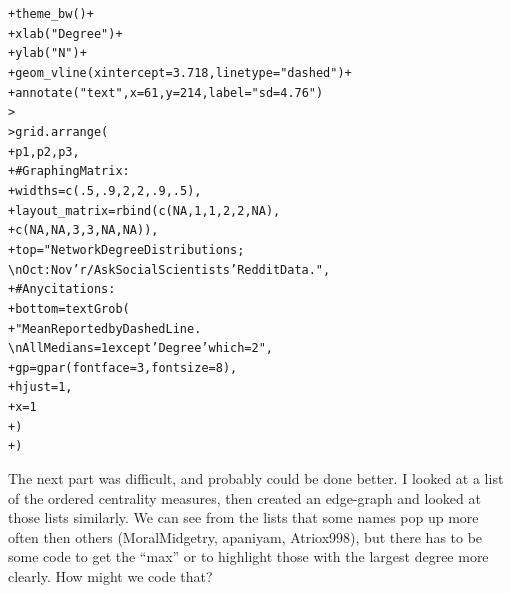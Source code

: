 \documentclass[12pt]{article}\usepackage[]{graphicx}\usepackage[]{color}
\makeatletter
\newcommand{\hlnum}[1]{\textcolor[rgb]{0.82,0.78,0.62}{#1}}%
\newcommand{\hlstr}[1]{\textcolor[rgb]{0.82,0.78,0.62}{#1}}%
\newcommand{\hlcom}[1]{\textcolor[rgb]{0.404,0.408,0.42}{#1}}%
\newcommand{\hlopt}[1]{\textcolor[rgb]{0.882,0.878,0.898}{#1}}%
\newcommand{\hlstd}[1]{\textcolor[rgb]{0.882,0.878,0.898}{#1}}%
\newcommand{\hlkwc}[1]{\textcolor[rgb]{0.812,0.522,0.388}{#1}}%
\newcommand{\hlkwd}[1]{\textcolor[rgb]{0.733,0.388,0.812}{#1}}%
\newenvironment{kframe}{%
 \def\at@end@of@kframe{}%
 \ifinner\ifhmode%
  \def\at@end@of@kframe{\end{minipage}}%
  \begin{minipage}{\columnwidth}%
 \fi\fi%
 \def\FrameCommand##1{\hskip\@totalleftmargin \hskip-\fboxsep
 \colorbox{shadecolor}{##1}\hskip-\fboxsep
     \hskip-\linewidth \hskip-\@totalleftmargin \hskip\columnwidth}%
 \MakeFramed {\advance\hsize-\width
   \@totalleftmargin\z@ \linewidth\hsize
   \@setminipage}}%
 {\par\unskip\endMakeFramed%
 \at@end@of@kframe}
\newenvironment{knitrout}{}{} %
\makeatother
\begin{document}
\begin{flushleft}
\begin{center}
\begin{knitrout}
\begin{kframe}
\begin{alltt}
\hlstd{+ }     \hlkwd{theme_bw}\hlstd{()}\hlopt{+}
\hlstd{+ }     \hlkwd{xlab}\hlstd{(}\hlstr{"Degree"}\hlstd{)}\hlopt{+}
\hlstd{+ }     \hlkwd{ylab}\hlstd{(}\hlstr{"N"}\hlstd{)}\hlopt{+}
\hlstd{+ }     \hlkwd{geom_vline}\hlstd{(}\hlkwc{xintercept}\hlstd{=}\hlnum{3.718}\hlstd{,} \hlkwc{linetype}\hlstd{=}\hlstr{"dashed"}\hlstd{)}\hlopt{+}
\hlstd{+ }     \hlkwd{annotate}\hlstd{(}\hlstr{"text"}\hlstd{,} \hlkwc{x} \hlstd{=} \hlnum{61}\hlstd{,} \hlkwc{y} \hlstd{=} \hlnum{214}\hlstd{,} \hlkwc{label} \hlstd{=} \hlstr{"sd = 4.76"}\hlstd{)}
\hlstd{> }
\hlstd{> }\hlkwd{grid.arrange}\hlstd{(}
\hlstd{+ }     \hlstd{p1, p2, p3,}
\hlstd{+ }     \hlcom{# Graphing Matrix:}
\hlstd{+ }     \hlkwc{widths} \hlstd{=} \hlkwd{c}\hlstd{(}\hlnum{.5}\hlstd{,} \hlnum{.9} \hlstd{,}\hlnum{2}\hlstd{,} \hlnum{2}\hlstd{,} \hlnum{.9}\hlstd{,} \hlnum{.5}\hlstd{),}
\hlstd{+ }     \hlkwc{layout_matrix} \hlstd{=} \hlkwd{rbind}\hlstd{(}\hlkwd{c}\hlstd{(}\hlnum{NA}\hlstd{,} \hlnum{1}\hlstd{,} \hlnum{1}\hlstd{,} \hlnum{2}\hlstd{,} \hlnum{2}\hlstd{,} \hlnum{NA}\hlstd{),}
\hlstd{+ }                           \hlkwd{c}\hlstd{(}\hlnum{NA}\hlstd{,} \hlnum{NA}\hlstd{,} \hlnum{3}\hlstd{,} \hlnum{3}\hlstd{,} \hlnum{NA}\hlstd{,} \hlnum{NA}\hlstd{)),}
\hlstd{+ }     \hlkwc{top} \hlstd{=} \hlstr{"Network Degree Distributions;
          \textbackslash{}n Oct : Nov'r/AskSocialScientists' Reddit Data."}\hlstd{,}
\hlstd{+ }     \hlcom{# Any citations:}
\hlstd{+ }     \hlkwc{bottom} \hlstd{=} \hlkwd{textGrob}\hlstd{(}
\hlstd{+ }          \hlstr{"Mean Reported by Dashed Line.
          \textbackslash{}n All Medians = 1 except 'Degree' which = 2 "}\hlstd{,}
\hlstd{+ }          \hlkwc{gp} \hlstd{=} \hlkwd{gpar}\hlstd{(}\hlkwc{fontface} \hlstd{=} \hlnum{3}\hlstd{,} \hlkwc{fontsize} \hlstd{=} \hlnum{8}\hlstd{),}
\hlstd{+ }          \hlkwc{hjust} \hlstd{=} \hlnum{1}\hlstd{,}
\hlstd{+ }          \hlkwc{x} \hlstd{=} \hlnum{1}
\hlstd{+ }     \hlstd{)}
\hlstd{+ }\hlstd{)}
\end{alltt}
\end{kframe}
\end{knitrout}
\end{center}


The next part was difficult, and probably could be done better. I looked at a list of the ordered centrality measures, then created an edge-graph and looked at those lists similarly. We can see from the lists that some names pop up more often then others (MoralMidgetry, apaniyam, Atriox998), but there has to be some code to get the ``max'' or to highlight those with the largest degree more clearly. How might we code that? 


\end{flushleft}
\end{document}
